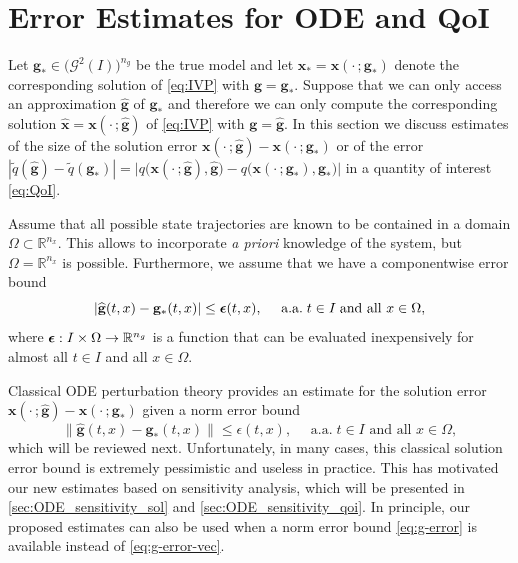 \documentclass[onefignum,onetabnum]{siamart220329}
\numberwithin{equation}{section}
\newcommand{\aall}{\mbox{ a.a.} \;}
\newcommand {\real} {\mathbb{R}}
\newcommand{\bg}{\ensuremath{\mathbf{g}}} %
\newcommand{\bx}{\ensuremath{\mathbf{x}}} %
\newcommand {\bepsilon} {\mbox{\boldmath $\epsilon$}}
\newcommand {\cG} {\mathcal{G}}
\begin{document}
%
\section{Error Estimates for ODE and QoI} \label{sec:ODE_error}
 Let $\bg_* \in \big(\cG^2(I)\big)^{n_g}$ be the true model and let $\bx_* = \bx(\cdot \, ; \bg_*)$ denote the corresponding solution 
 of  \eqref{eq:IVP} with $\bg = \bg_*$.
 Suppose that we can only access an approximation $\widehat{\bg}$ of $\bg_*$ and therefore
 we can only compute the corresponding solution $\widehat{\bx} = \bx(\cdot \, ; \widehat{\bg})$
 of  \eqref{eq:IVP} with $\bg = \widehat{\bg}$.
 In this section we discuss estimates of the size of the solution
 error $\bx(\cdot \, ; \widehat{\bg}) - \bx(\cdot \, ; \bg_*)$ or of the error $| \widetilde{q}(\widehat{\bg}) - \widetilde{q}(\bg_*) | = \big| q\big(\bx(\cdot \, ; \widehat{\bg}), \widehat{\bg} \big) - q\big(\bx(\cdot \, ; \bg_*), \bg_* \big) \big|$
 in a quantity of interest \eqref{eq:QoI}.

Assume that all possible state trajectories are known to be contained in a domain $\Omega \subset \real^{n_x}$.
This allows to incorporate \emph{a priori} knowledge of the system, but $\Omega = \real^{n_x}$ is possible.
Furthermore, we assume that we have a componentwise error bound 
\begin{equation}    \label{eq:g-error-vec}
	| \widehat{\bg}(t, x) - \bg_*(t, x) | \leq  \bepsilon(t, x), \quad \aall t \in I \; \mbox{and all } x \in \Omega,
\end{equation}
where
$\bepsilon: I \times \Omega \rightarrow \real^{n_g}$ is a function that can be evaluated inexpensively for
almost all $t \in I$ and all $x \in \Omega$. 

Classical ODE perturbation theory provides an estimate for the solution error 
$\bx(\cdot \, ; \widehat{\bg}) - \bx(\cdot \, ; \bg_*)$ given a norm error bound
\begin{equation}    \label{eq:g-error}
	\| \widehat{\bg}(t, x) - \bg_*(t, x) \| \leq  \epsilon(t, x), \quad \aall t \in I \mbox{ and all } x \in \Omega,
\end{equation}
which will be reviewed next. Unfortunately, in many cases, this classical solution error bound
is extremely pessimistic and useless in practice. This has motivated our new
estimates based on sensitivity analysis, which will be presented in
\cref{sec:ODE_sensitivity_sol} and \cref{sec:ODE_sensitivity_qoi}.
In principle, our proposed estimates can also be used when a  norm error bound \eqref{eq:g-error}
is available instead of \eqref{eq:g-error-vec}.
\end{document}

